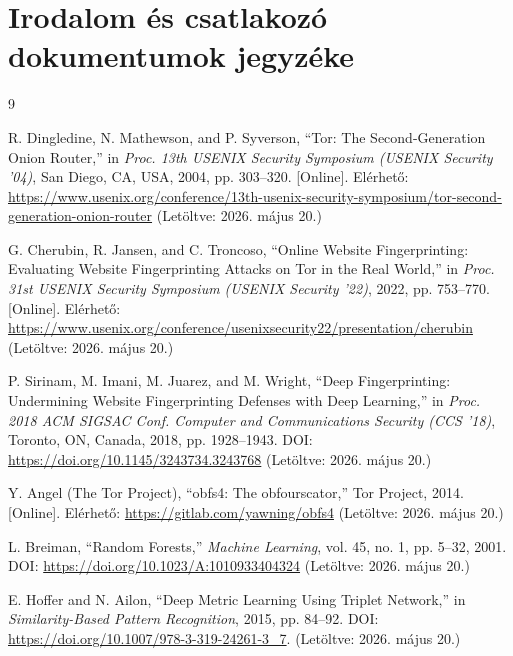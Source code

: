 \documentclass[a4paper,oneside]{article}
\begin{document}
\section{Irodalom és csatlakozó dokumentumok jegyzéke}
\label{sec:irod-es-csatl}
 
\label{sec:tanulm-irod-jegyz}
 
\begin{thebibliography}{9}
 
 R. Dingledine, N. Mathewson, and P. Syverson,
``Tor: The Second-Generation Onion Router,''
in \textit{Proc.
13th USENIX Security Symposium (USENIX Security '04)},
San Diego, CA, USA, 2004, pp. 303--320.
[Online].
Elérhető: \url{https://www.usenix.org/conference/13th-usenix-security-symposium/tor-second-generation-onion-router}
(Letöltve: 2026. május 20.)
 
 G. Cherubin, R. Jansen, and C. Troncoso,
``Online Website Fingerprinting: Evaluating Website Fingerprinting Attacks on Tor in the Real World,''
in \textit{Proc.
31st USENIX Security Symposium (USENIX Security '22)},
2022, pp. 753--770.
[Online].
Elérhető: \url{https://www.usenix.org/conference/usenixsecurity22/presentation/cherubin}
(Letöltve: 2026. május 20.)
 
 P. Sirinam, M. Imani, M. Juarez, and M. Wright,
``Deep Fingerprinting: Undermining Website Fingerprinting Defenses with Deep Learning,''
in \textit{Proc.
2018 ACM SIGSAC Conf. Computer and Communications Security (CCS '18)},
Toronto, ON, Canada, 2018, pp. 1928--1943.
DOI: \url{https://doi.org/10.1145/3243734.3243768}
(Letöltve: 2026. május 20.)
 
 Y. Angel (The Tor Project),
``obfs4: The obfourscator,''
Tor Project, 2014.
[Online].
Elérhető: \url{https://gitlab.com/yawning/obfs4}
(Letöltve: 2026. május 20.)
 
 L. Breiman,
``Random Forests,''
\textit{Machine Learning}, vol. 45, no.
1, pp. 5--32, 2001.
DOI: \url{https://doi.org/10.1023/A:1010933404324}
(Letöltve: 2026. május 20.)

 E. Hoffer and N. Ailon,
``Deep Metric Learning Using Triplet Network,''
in \emph{Similarity-Based Pattern Recognition}, 2015, pp. 84--92.
DOI: \url{https://doi.org/10.1007/978-3-319-24261-3_7}.
(Letöltve: 2026. május 20.)

\end{thebibliography}
\end{document}
